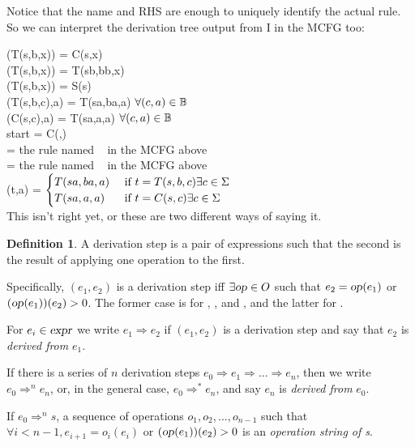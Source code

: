 \documentclass[12pt]{article}
\theoremstyle{definition}
\newtheorem{definition}{Definition}[section]
\begin{document}
Notice that the name and RHS are enough to uniquely identify the
actual rule. So we can interpret the derivation tree output from I in
the MCFG too:

\cl(T(s,b,x)) = C(s,x)\\
\cp(T(s,b,x)) = T(sb,bb,x)\\
\ed(T(s,b,x)) = S(s)\\
\mg(T(s,b,c),a) = T(sa,ba,a) $\forall (c,a)\in\mathbb{B}$\\
\mg(C(s,c),a) = T(sa,a,a) $\forall (c,a)\in\mathbb{B}$\\

\llb start \rrb = C(\emp,\LBOUND)\\
\llb\cl\rrb = the rule named \cl~ in the MCFG above\\
\llb\cp\rrb = the rule named \cp~ in the MCFG above\\
\llb\mg\rrb(t,a) = $
\begin{cases}
  T(sa,ba,a) & \text{ if } t = T(s,b,c) \exists c\in\Sigma\\
  T(sa,a,a) & \text{ if } t = C(s,c) \exists c\in\Sigma\\
\end{cases}
$\\

This isn't right yet, or these are two different ways of saying it.

\begin{definition}
  A derivation step is a pair of expressions such that the second is the result of applying one operation to the first.

  Specifically,  $(e_1,e_2)$ is a derivation step iff $\exists \text{\textsl{op}}\in O$ such that $e_2=\text{\textsl{op}}(e_1)$ or $(\text{\textsl{op}}(e_1))(e_2)>0$. The former case is for \cp, \cl, and \ed, and the latter for \mg.

  For $e_i\in\text{\textsl{expr}}$  we write $e_1 \Rightarrow e_2$ if $(e_1,e_2)$ is a derivation step and say that $e_2$ is \textit{derived from} $e_1$.

  If there is a series of $n$ derivation steps $e_0\Rightarrow e_1 \Rightarrow \dots \Rightarrow e_n$, then we write $e_0\Rightarrow^n e_n$, or, in the general case, $e_0\Rightarrow^* e_n$, and say  $e_n$ is \textit{derived from} $e_0$.

  If $e_0\Rightarrow^n s$, a sequence of operations $o_1,o_2,...,o_{n-1}$ such that $\forall i<n-1, e_{i+1}=o_i(e_i)$ or $(\text{\textsl{op}}(e_1))(e_2)>0$ is an \textit{operation string of s}. 


\end{definition}
\end{document}
